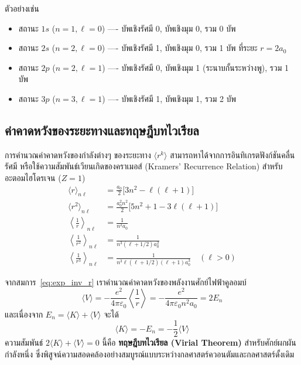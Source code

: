 ตัวอย่างเช่น
\begin{itemize}
    \item สถานะ $1s$ ($n=1, \ell=0$) ---- บัพเชิงรัศมี 0, บัพเชิงมุม 0, รวม 0 บัพ
    \item สถานะ $2s$ ($n=2, \ell=0$) ---- บัพเชิงรัศมี 1, บัพเชิงมุม 0, รวม 1 บัพ ที่ระยะ $r = 2a_0$
    \item สถานะ $2p$ ($n=2, \ell=1$) ---- บัพเชิงรัศมี 0, บัพเชิงมุม 1 (ระนาบกั้นระหว่างพู), รวม 1 บัพ
    \item สถานะ $3p$ ($n=3, \ell=1$) ---- บัพเชิงรัศมี 1, บัพเชิงมุม 1, รวม 2 บัพ
\end{itemize}

\subsection{ค่าคาดหวังของระยะทางและทฤษฎีบทไวเรียล}
การคำนวณค่าคาดหวังของกำลังต่างๆ ของระยะทาง $\langle r^k \rangle$ สามารถหาได้จากการอินทิเกรตฟังก์ชันคลื่นรัศมี หรือใช้ความสัมพันธ์เวียนเกิดของคราเมอส์ (Kramers' Recurrence Relation) สำหรับอะตอมไฮโดรเจน ($Z = 1$)
\begin{align}
\langle r \rangle_{n\ell} &= \frac{a_0}{2} \Big[ 3n^2 - \ell(\ell + 1) \Big] \label{eq:exp_r} \\
\langle r^2 \rangle_{n\ell} &= \frac{a_0^2 n^2}{2} \Big[ 5n^2 + 1 - 3\ell(\ell + 1) \Big] \label{eq:exp_r2} \\
\left\langle \frac{1}{r} \right\rangle_{n\ell} &= \frac{1}{n^2 a_0} \label{eq:exp_inv_r} \\
\left\langle \frac{1}{r^2} \right\rangle_{n\ell} &= \frac{1}{n^3 (\ell + 1/2) a_0^2} \label{eq:exp_inv_r2} \\
\left\langle \frac{1}{r^3} \right\rangle_{n\ell} &= \frac{1}{n^3 \ell(\ell + 1/2)(\ell + 1) a_0^3} \quad (\ell > 0) \label{eq:exp_inv_r3}
\end{align}

จากสมการ~\eqref{eq:exp_inv_r} เราคำนวณค่าคาดหวังของพลังงานศักย์ไฟฟ้าคูลอมบ์
\begin{equation}
\langle V \rangle = -\frac{e^2}{4\pi\varepsilon_0} \left\langle \frac{1}{r} \right\rangle = -\frac{e^2}{4\pi\varepsilon_0 n^2 a_0} = 2 E_n
\end{equation}
และเนื่องจาก $E_n = \langle K \rangle + \langle V \rangle$ จะได้
\begin{equation}
\langle K \rangle = -E_n = -\frac{1}{2}\langle V \rangle
\end{equation}
ความสัมพันธ์ $2\langle K \rangle + \langle V \rangle = 0$ นี้คือ \textbf{ทฤษฎีบทไวเรียล (Virial Theorem)} สำหรับศักย์ผกผันกำลังหนึ่ง ซึ่งพิสูจน์ความสอดคล้องอย่างสมบูรณ์แบบระหว่างกลศาสตร์ควอนตัมและกลศาสตร์ดั้งเดิม

